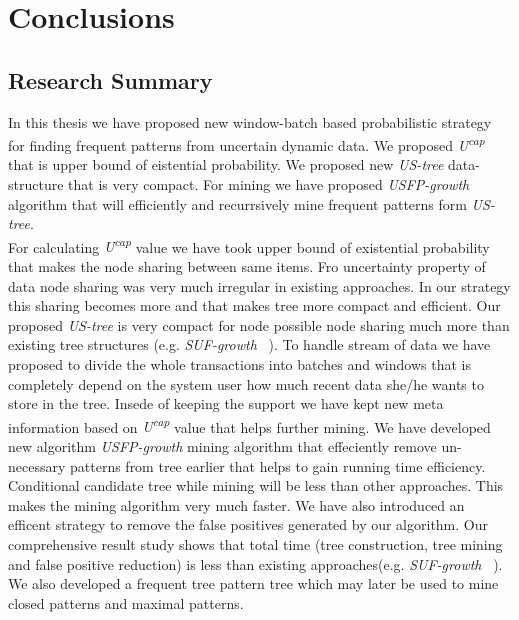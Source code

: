 \chapter{Conclusions}
\section{Research Summary}
In this thesis we have proposed new window-batch based probabilistic strategy for finding frequent patterns from uncertain dynamic data. We proposed  \emph{U\textsuperscript{cap}} that is upper bound of eistential probability. We proposed new \emph{US-tree} data-structure that is very compact. For mining we have proposed \emph{USFP-growth} algorithm that will efficiently and recurrsively mine frequent patterns form \emph{US-tree}.\\
For calculating \emph{U\textsuperscript{cap}} value we have took upper bound of existential probability that makes the node sharing between same items. Fro uncertainty property of data node sharing was very much irregular in existing approaches. In our strategy this sharing becomes more and that makes tree more compact and efficient. Our proposed \emph{US-tree} is very compact for node possible node sharing much more than existing tree structures (e.g. \emph{SUF-growth} ~\cite{suf_growth}). To handle stream of data we have proposed to divide the whole transactions into batches and windows that is completely depend on the system user how much recent data she/he wants to store in the tree. Insede of keeping the support we have kept new meta information based on \emph{U\textsuperscript{cap}} value that helps further mining. We have developed new algorithm \emph{USFP-growth} mining algorithm that effeciently remove un-necessary patterns from tree earlier that helps to gain running time efficiency. Conditional candidate tree while mining will be less than other approaches. This makes the mining algorithm very much faster. We have also introduced an efficent strategy to remove the false positives generated by our algorithm. Our comprehensive result study shows that total time (tree construction, tree mining and false positive reduction) is less than existing approaches(e.g. \emph{SUF-growth} ~\cite{suf_growth}). We also developed a frequent tree pattern tree which may later be used to mine closed patterns and maximal patterns.
